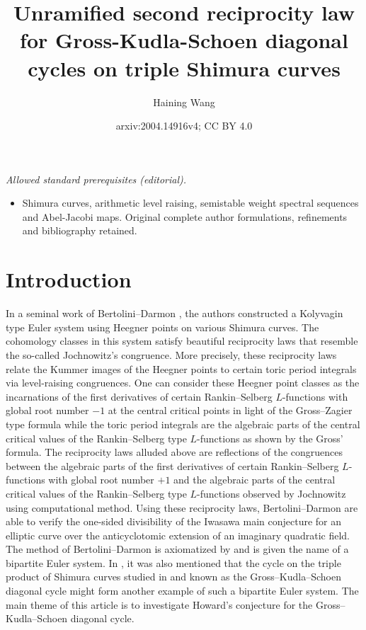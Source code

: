 \documentclass[10pt]{amsart}
\title{Unramified second reciprocity law for Gross-Kudla-Schoen diagonal cycles on triple Shimura curves}
\author{Haining Wang}
\date{arxiv:2004.14916v4; CC BY 4.0}
\numberwithin{equation}{section}
\theoremstyle{plain}
\numberwithin{equation}{section}
\theoremstyle{definition}
\theoremstyle{remark}
\begin{document}
\maketitle
\noindent\textit{Allowed standard prerequisites (editorial).}\begin{itemize}
\item Shimura curves, arithmetic level raising, semistable weight spectral sequences and Abel-Jacobi maps. Original complete author formulations, refinements and bibliography retained.
\end{itemize}\medskip
\section{Introduction}
In a seminal work of Bertolini--Darmon \cite{BD}, the authors constructed a Kolyvagin type Euler system using Heegner points on various Shimura curves. The cohomology classes in this system satisfy beautiful reciprocity laws that resemble the so-called Jochnowitz's congruence. More precisely, these reciprocity laws relate the Kummer images of the Heegner points to certain toric period integrals via level-raising congruences. One can consider these Heegner point classes as the incarnations of the first derivatives of certain Rankin--Selberg $L$-functions with global root number $-1$ at the central critical points in light of the Gross--Zagier type formula while the toric period integrals are the algebraic parts of the central critical values of the Rankin--Selberg type $L$-functions as shown by the Gross' formula. The reciprocity laws alluded above are reflections of the congruences between the algebraic parts of the first derivatives of certain Rankin--Selberg $L$-functions with global root number $+1$ and  the algebraic parts of the central critical values of the Rankin--Selberg type $L$-functions observed by Jochnowitz using computational method. Using these reciprocity laws,  Bertolini--Darmon are able to verify the one-sided divisibility of the Iwasawa main conjecture for an elliptic curve over the anticyclotomic extension of an imaginary quadratic field. The method of Bertolini--Darmon is axiomatized by \cite{How} and is given the name of a bipartite Euler system. In \cite{How}, it was also mentioned that the cycle on the triple product of Shimura curves studied in \cite{GK} and \cite{GS} known as the Gross--Kudla--Schoen diagonal cycle might form another example of such a bipartite Euler system. The main theme of this article is to investigate Howard's conjecture for the Gross--Kudla--Schoen diagonal cycle.
\end{document}
